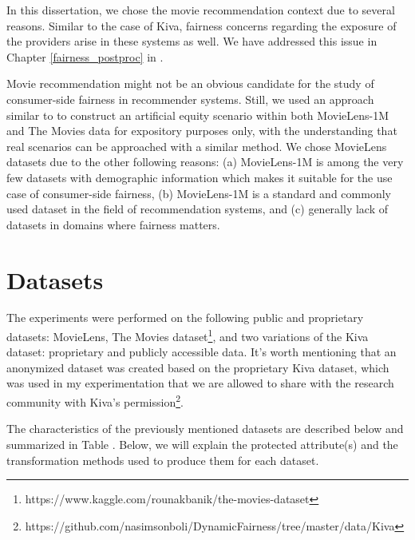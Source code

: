     In this dissertation, we chose the movie recommendation context due to several reasons. Similar to the case of Kiva, fairness concerns regarding the exposure of the providers arise in these systems as well. We have addressed this issue in Chapter \ref{fairness_postproc} in \cite{sonboli2020opportunistic,liu2019farpfar} .
    
    Movie recommendation might not be an obvious candidate for the study of consumer-side fairness in recommender systems. Still, we used an approach similar to \cite{yao2017beyond} to construct an artificial equity scenario within both MovieLens-1M and The Movies data for expository purposes only, with the understanding that real scenarios can be approached with a similar method. We chose MovieLens datasets due to the other following reasons: (a) MovieLens-1M is among the very few datasets with demographic information which makes it suitable for the use case of consumer-side fairness, (b) MovieLens-1M is a standard and commonly used dataset in the field of recommendation systems, and (c) generally lack of datasets in domains where fairness matters.

    
\section{Datasets}

The experiments were performed on the following public and proprietary datasets: MovieLens\cite{movielens}, The Movies dataset\footnote{https://www.kaggle.com/rounakbanik/the-movies-dataset}, and two variations of the Kiva dataset: proprietary and publicly accessible data.
It's worth mentioning that an anonymized dataset was created based on the proprietary Kiva dataset, which was used in my experimentation that we are allowed to share with the research community with Kiva's permission\footnote{https://github.com/nasimsonboli/DynamicFairness/tree/master/data/Kiva}.



The characteristics of the previously mentioned datasets are described below and summarized in Table . Below, we will explain the protected attribute(s) and the transformation methods used to produce them for each dataset.

